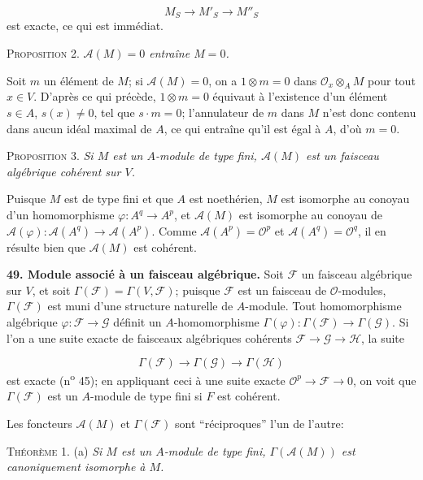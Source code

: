 \begin{equation*}
M_S \to M'_S \to M''_S
\end{equation*}
est exacte, ce qui est immédiat.

\textsc{Proposition} 2. \textit{$\mathcal{A}(M) = 0$ entraîne $M = 0$.}

Soit $m$ un élément de $M$; si $\mathcal{A}(M) = 0$, on a $1 \otimes m = 0$ dans $\mathcal{O}_x \otimes_A M$ pour tout $x \in V$. D'après ce qui précède, $1 \otimes m = 0$ équivaut à l'existence d'un élément $s \in A$, $s(x) \neq 0$, tel que $s \cdot m = 0$; l'annulateur de $m$ dans $M$ n'est donc contenu dans aucun idéal maximal de $A$, ce qui entraîne qu'il est égal à $A$, d'où $m = 0$.

\textsc{Proposition} 3. \textit{Si $M$ est un $A$-module de type fini, $\mathcal{A}(M)$ est un faisceau algébrique cohérent sur $V$.}

Puisque $M$ est de type fini et que $A$ est noethérien, $M$ est isomorphe au conoyau d'un homomorphisme $\varphi : A^q \to A^p$, et $\mathcal{A}(M)$ est isomorphe au conoyau de $\mathcal{A}(\varphi) : \mathcal{A}(A^q) \to \mathcal{A}(A^p)$. Comme $\mathcal{A}(A^p) = \mathcal{O}^p$ et $\mathcal{A}(A^q) = \mathcal{O}^q$, il en résulte bien que $\mathcal{A}(M)$ est cohérent.

\textbf{49. Module associé à un faisceau algébrique.} Soit $\mathcal{F}$ un faisceau algébrique sur $V$, et soit $\Gamma(\mathcal{F}) = \Gamma(V, \mathcal{F})$; puisque $\mathcal{F}$ est un faisceau de $\mathcal{O}$-modules, $\Gamma(\mathcal{F})$ est muni d'une structure naturelle de $A$-module. Tout homomorphisme algébrique $\varphi : \mathcal{F} \to \mathcal{G}$ définit un $A$-homomorphisme $\Gamma(\varphi) : \Gamma(\mathcal{F}) \to \Gamma(\mathcal{G})$. Si l'on a une suite exacte de faisceaux algébriques cohérents $\mathcal{F} \to \mathcal{G} \to \mathcal{H}$, la suite

\begin{equation*}
\Gamma(\mathcal{F}) \to \Gamma(\mathcal{G}) \to \Gamma(\mathcal{H})
\end{equation*}
est exacte (n\textsuperscript{o} 45); en appliquant ceci à une suite exacte $\mathcal{O}^p \to \mathcal{F} \to 0$, on voit que $\Gamma(\mathcal{F})$ est un $A$-module de type fini si $F$ est cohérent.

Les foncteurs $\mathcal{A}(M)$ et $\Gamma(\mathcal{F})$ sont ``réciproques'' l'un de l'autre:

\textsc{Théorème} 1. (a) \textit{Si $M$ est un $A$-module de type fini, $\Gamma(\mathcal{A}(M))$ est canoniquement isomorphe à $M$.}

